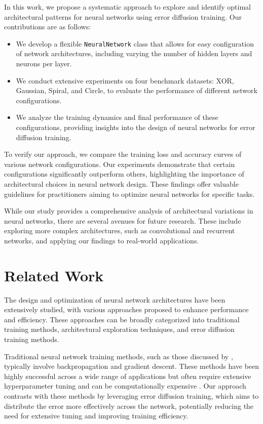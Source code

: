 \documentclass{article} %
\begin{document}
In this work, we propose a systematic approach to explore and identify optimal architectural patterns for neural networks using error diffusion training. Our contributions are as follows:
\begin{itemize}
    \item We develop a flexible \texttt{NeuralNetwork} class that allows for easy configuration of network architectures, including varying the number of hidden layers and neurons per layer.
    \item We conduct extensive experiments on four benchmark datasets: XOR, Gaussian, Spiral, and Circle, to evaluate the performance of different network configurations.
    \item We analyze the training dynamics and final performance of these configurations, providing insights into the design of neural networks for error diffusion training.
\end{itemize}

To verify our approach, we compare the training loss and accuracy curves of various network configurations. Our experiments demonstrate that certain configurations significantly outperform others, highlighting the importance of architectural choices in neural network design. These findings offer valuable guidelines for practitioners aiming to optimize neural networks for specific tasks.

While our study provides a comprehensive analysis of architectural variations in neural networks, there are several avenues for future research. These include exploring more complex architectures, such as convolutional and recurrent networks, and applying our findings to real-world applications.

\section{Related Work}
\label{sec:related}

The design and optimization of neural network architectures have been extensively studied, with various approaches proposed to enhance performance and efficiency. These approaches can be broadly categorized into traditional training methods, architectural exploration techniques, and error diffusion training methods.

Traditional neural network training methods, such as those discussed by \citet{goodfellow2016deep}, typically involve backpropagation and gradient descent. These methods have been highly successful across a wide range of applications but often require extensive hyperparameter tuning and can be computationally expensive \citep{LeCun1998GradientbasedLA}. Our approach contrasts with these methods by leveraging error diffusion training, which aims to distribute the error more effectively across the network, potentially reducing the need for extensive tuning and improving training efficiency.
\end{document}
